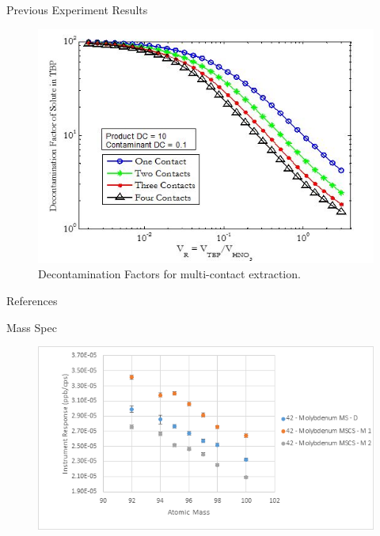 \documentclass{beamer}
\begin{document}
\begin{frame}{Previous Experiment Results}
  \begin{figure}[H]
    \vspace*{-.1cm}
    \begin{center}
      \includegraphics[scale = 0.6]{figures/df}
      \vspace{-0.5cm}
      \caption{\tiny{Decontamination Factors for multi-contact extraction.}}
    \end{center}
  \end{figure}
\end{frame}

\begin{frame}[allowframebreaks]{References}
\def\newblock{}
\nocite{*}
\scriptsize{}

\end{frame}

\begin{frame}{Mass Spec}
  \begin{figure}[H]
    \vspace*{-1cm}
    \begin{center}
      \includegraphics[scale = 0.75]{figures/instrument_response}
    \end{center}
  \end{figure}
\end{frame}
\end{document}
